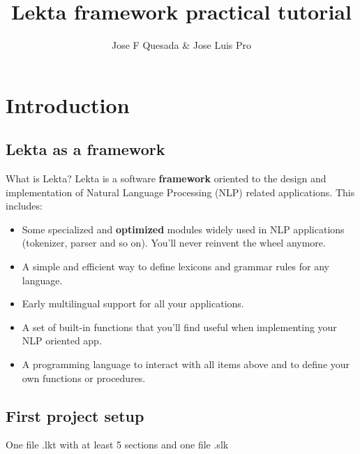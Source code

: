 \documentclass[11pt]{beamer}
\title[Lekta framework practical tutorial]{Lekta framework practical tutorial}
\author{Jose F Quesada \& Jose Luis Pro}
\date{}
\begin{document}
\begin{frame}
\titlepage
\end{frame}

\section{Introduction}

\subsection{Lekta as a framework}

\begin{frame}
	\begin{block}{What is Lekta?}
			Lekta is a software \textbf{framework} oriented to the design and implementation of Natural Language Processing (NLP) related applications. This includes:
			\pause
			\begin{itemize}
				\item Some specialized and \textbf{optimized} modules widely used in NLP applications (tokenizer, parser and so on). You'll never reinvent the wheel anymore.
				\pause
				\item A simple and efficient way to define lexicons and grammar rules for any language.
				\pause
				\item Early multilingual support for all your applications.
				\pause
				\item A set of built-in functions that you'll find useful when implementing your NLP oriented app.
				\pause
				\item A programming language to interact with all items above and to define your own functions or procedures.
			\end{itemize}
	\end{block}
\end{frame}

\subsection{First project setup}

\begin{frame}
One file .lkt with at least 5 sections and one file .slk
\end{frame}
\end{document}
